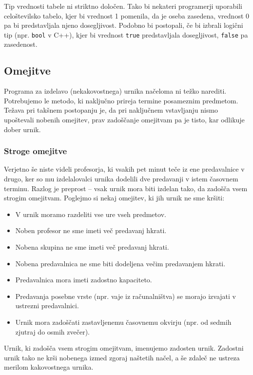\documentclass[a4paper,10pt]{article}
\begin{document}
Tip vrednosti tabele ni striktno določen. Tako bi nekateri programerji uporabili
celoštevilsko tabelo, kjer bi vrednost 1 pomenila, da je oseba zasedena, vrednost 0
pa bi predstavljala njeno dosegljivost. Podobno bi postopali, če bi izbrali logični
tip (npr. \texttt{bool} v C++), kjer bi vrednost \texttt{true} predstavljala
dosegljivost, \texttt{false} pa zasedenost.

\subsection{Omejitve}

Programa za izdelavo (nekakovostnega) urnika načeloma ni težko narediti. Potrebujemo
le metodo, ki naključno prireja termine posameznim predmetom. Težava pri takšnem postopanju
je, da pri naključnem vstavljanju nismo upoštevali nobenih omejitev, prav zadoščanje omejitvam
pa je tisto, kar odlikuje dober urnik.

\subsubsection{Stroge omejitve}

Verjetno še niste videli profesorja, ki vsakih pet minut teče iz ene predavalnice v drugo,
ker so mu izdelalovalci urnika dodelili dve predavanji v istem časovnem terminu. Razlog
je preprost -- vsak urnik mora biti izdelan tako, da zadošča vsem strogim omejitvam.
Poglejmo si nekaj omejitev, ki jih urnik ne sme kršiti:


\begin{itemize}
   
      \item V urnik moramo razdeliti vse ure vseh predmetov.
      \item Noben profesor ne sme imeti več predavanj hkrati.
      \item Nobena skupina ne sme imeti več predavanj hkrati.
      \item Nobena predavalnica ne sme biti dodeljena večim predavanjem hkrati.
      \item Predavalnica mora imeti zadostno kapaciteto.
      \item Predavanja posebne vrste (npr. vaje iz računalništva) se morajo izvajati v ustrezni predavalnici.
      \item Urnik mora zadoščati zastavljenemu časovnemu okvirju (npr. od sedmih zjutraj do osmih zvečer).
   
\end{itemize}
\noindent
Urnik, ki zadošča vsem strogim omejitvam, imenujemo zadosten urnik. Zadostni urnik tako ne
krši nobenega izmed zgoraj naštetih načel, a še zdaleč ne ustreza merilom kakovostnega urnika.
\end{document}
